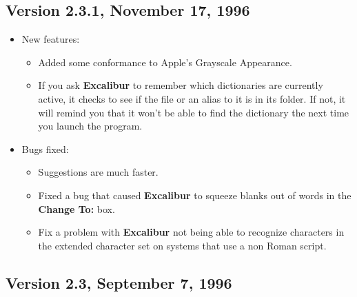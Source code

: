 \documentclass[11pt,titlepage]{article}
\newcommand{\ex}{\textbf{Excalibur}}
\begin{document}
\subsection{Version 2.3.1, November 17, 1996}

\begin{itemize}
\item New features:
  \begin{itemize}
  \item Added some conformance to Apple's Grayscale Appearance.

  \item If you ask \ex{} to remember which dictionaries are currently
    active, it checks to see if the file or an alias to it is in its
    folder.  If not, it will remind you that it won't be able to find
    the dictionary the next time you launch the program.
  \end{itemize}

\item Bugs fixed:

  \begin{itemize}
  \item Suggestions are much faster.

  \item Fixed a bug that caused \ex{} to squeeze blanks out of words
    in the \textbf{Change To:} box.

  \item Fix a problem with \ex{} not being able to recognize
    characters in the extended character set on systems that use a non
    Roman script.
  \end{itemize}
\end{itemize}

\subsection{Version 2.3, September 7, 1996}
\end{document}
